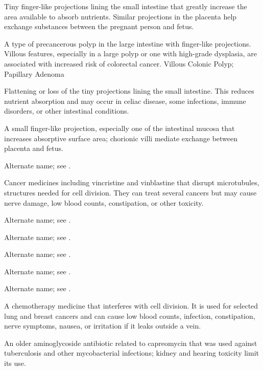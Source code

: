  Tiny finger-like projections lining the small intestine that greatly increase the area available to absorb nutrients. Similar projections in the placenta help exchange substances between the pregnant person and fetus.

 A type of precancerous polyp in the large intestine with finger-like projections. Villous features, especially in a large polyp or one with high-grade dysplasia, are associated with increased risk of colorectal cancer.
\synonyms
Villous Colonic Polyp; Papillary Adenoma

 Flattening or loss of the tiny projections lining the small intestine. This reduces nutrient absorption and may occur in celiac disease, some infections, immune disorders, or other intestinal conditions.

 A small finger-like projection, especially one of the intestinal mucosa that increases absorptive surface area; chorionic villi mediate exchange between placenta and fetus.

 Alternate name; see .

 Cancer medicines including vincristine and vinblastine that disrupt microtubules, structures needed for cell division. They can treat several cancers but may cause nerve damage, low blood counts, constipation, or other toxicity.

 Alternate name; see .

 Alternate name; see .

 Alternate name; see .

 Alternate name; see .

 Alternate name; see .

 A chemotherapy medicine that interferes with cell division. It is used for selected lung and breast cancers and can cause low blood counts, infection, constipation, nerve symptoms, nausea, or irritation if it leaks outside a vein.

 An older aminoglycoside antibiotic related to capreomycin that was used against tuberculosis and other mycobacterial infections; kidney and hearing toxicity limit its use.

